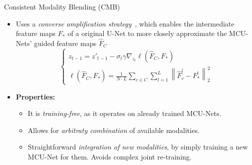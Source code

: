 \documentclass[pdf]{beamer}
\begin{document}
\begin{frame}{Consistent Modality Blending (CMB)}
    \begin{itemize}
        \item Uses a \textit{converse amplification strategy}~\cite{dhariwal2021diffusion}, which enables the intermediate feature maps $F_*$ of a original U-Net to more closely approximate the MCU-Nets' guided feature maps $\hat{F}_C$
        \[
        \begin{cases}
            z_{t-1} = z'_{t-1} - \sigma_t \gamma \nabla_{z_t} \ell(\hat{F}_C, F_*)
            \\
            \ell(\hat{F}_C, F_*) = \frac{1}{N \cdot L} \sum\limits_{c\in C} \sum\limits_{l=1}^{L} \left\| \hat{F}_c^l - F_*^l \right\|_2^2
        \end{cases}
        \]
        \item \textbf{Properties:}
        \begin{itemize}
            \item It is \textit{training-free}, as it operates on already trained MCU-Nets.
            \item Allows for \textit{arbitraty combination} of available modalities.
            \item Straightforward \textit{integration of new modalities}, by simply training a new MCU-Net for them. Avoids complex joint re-training.
        \end{itemize}
        
    \end{itemize}
\end{frame}
\end{document}
